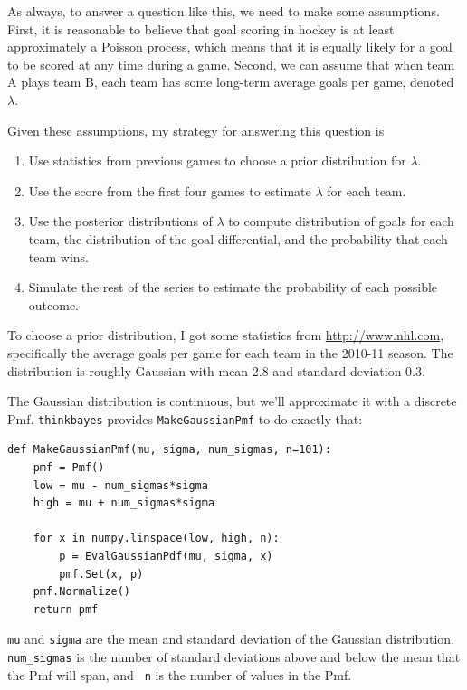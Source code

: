 \documentclass[12pt]{book}
\begin{document}
As always, to answer a question like this, we need to make some
assumptions.  First, it is reasonable to believe that goal scoring in
hockey is at least approximately a Poisson process, which means that
it is equally likely for a goal to be scored at any time during a
game.  Second, we can assume that when team A plays team B, each team
has some long-term average goals per game, denoted $\lambda$.

Given these assumptions, my strategy for answering this question is

\begin{enumerate}

\item Use statistics from previous games to choose a prior
distribution for $\lambda$.

\item Use the score from the first four games to estimate $\lambda$
for each team.

\item Use the posterior distributions of $\lambda$ to compute 
distribution of goals for each team, the distribution of the
goal differential, and the probability that each team wins.

\item Simulate the rest of the series to estimate the probability
of each possible outcome.

\end{enumerate}

To choose a prior distribution, I got some statistics from
\url{http://www.nhl.com}, specifically the average goals per game
for each team in the 2010-11 season.  The distribution is roughly
Gaussian with mean 2.8 and standard deviation 0.3.

The Gaussian distribution is continuous, but we'll approximate it with
a discrete Pmf.  \verb"thinkbayes" provides \verb"MakeGaussianPmf" to
do exactly that:

\begin{verbatim}
def MakeGaussianPmf(mu, sigma, num_sigmas, n=101):
    pmf = Pmf()
    low = mu - num_sigmas*sigma
    high = mu + num_sigmas*sigma

    for x in numpy.linspace(low, high, n):
        p = EvalGaussianPdf(mu, sigma, x)
        pmf.Set(x, p)
    pmf.Normalize()
    return pmf
\end{verbatim}  

{\tt mu} and {\tt sigma} are the mean and standard deviation of the
Gaussian distribution.  \verb"num_sigmas" is the number of standard
deviations above and below the mean that the Pmf will span, and {\tt
  n} is the number of values in the Pmf.
\end{document}
